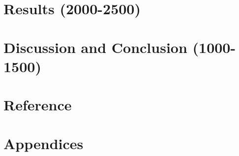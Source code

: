 \documentclass[
  11pt,
]{article}
\begin{document}
\hypertarget{results-2000-2500}{%
\section{Results (2000-2500)}\label{results-2000-2500}}

\hypertarget{discussion-and-conclusion-1000-1500}{%
\section{Discussion and Conclusion
(1000-1500)}\label{discussion-and-conclusion-1000-1500}}

\hypertarget{reference}{%
\section{Reference}\label{reference}}

\hypertarget{appendices}{%
\section{Appendices}\label{appendices}}
\end{document}
